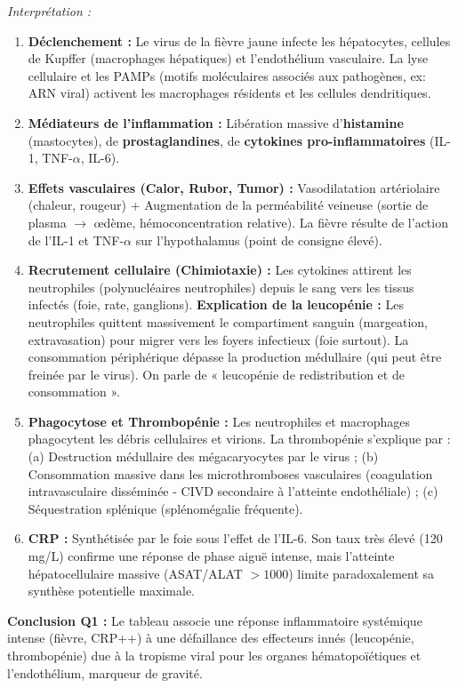 \documentclass[11pt]{article}
\begin{document}
\begin{exoresolu}
\textit{Interprétation :}
\begin{enumerate}
    \item \textbf{Déclenchement :} Le virus de la fièvre jaune infecte les hépatocytes, cellules de Kupffer (macrophages hépatiques) et l'endothélium vasculaire. La lyse cellulaire et les PAMPs (motifs moléculaires associés aux pathogènes, ex: ARN viral) activent les macrophages résidents et les cellules dendritiques.
    \item \textbf{Médiateurs de l'inflammation :} Libération massive d'\textbf{histamine} (mastocytes), de \textbf{prostaglandines}, de \textbf{cytokines pro-inflammatoires} (IL-1, TNF-$\alpha$, IL-6).
    \item \textbf{Effets vasculaires (Calor, Rubor, Tumor) :} Vasodilatation artériolaire (chaleur, rougeur) + Augmentation de la perméabilité veineuse (sortie de plasma $\rightarrow$ œdème, hémoconcentration relative). La fièvre résulte de l'action de l'IL-1 et TNF-$\alpha$ sur l'hypothalamus (point de consigne élevé).
    \item \textbf{Recrutement cellulaire (Chimiotaxie) :} Les cytokines attirent les neutrophiles (polynucléaires neutrophiles) depuis le sang vers les tissus infectés (foie, rate, ganglions). \textbf{Explication de la leucopénie :} Les neutrophiles quittent massivement le compartiment sanguin (margeation, extravasation) pour migrer vers les foyers infectieux (foie surtout). La consommation périphérique dépasse la production médullaire (qui peut être freinée par le virus). On parle de « leucopénie de redistribution et de consommation ».
    \item \textbf{Phagocytose et Thrombopénie :} Les neutrophiles et macrophages phagocytent les débris cellulaires et virions. La thrombopénie s'explique par : (a) Destruction médullaire des mégacaryocytes par le virus ; (b) Consommation massive dans les microthromboses vasculaires (coagulation intravasculaire disséminée - CIVD secondaire à l'atteinte endothéliale) ; (c) Séquestration splénique (splénomégalie fréquente).
    \item \textbf{CRP :} Synthétisée par le foie sous l'effet de l'IL-6. Son taux très élevé (120 mg/L) confirme une réponse de phase aiguë intense, mais l'atteinte hépatocellulaire massive (ASAT/ALAT $> 1000$) limite paradoxalement sa synthèse potentielle maximale.
\end{enumerate}
\textbf{Conclusion Q1 :} Le tableau associe une réponse inflammatoire systémique intense (fièvre, CRP++) à une défaillance des effecteurs innés (leucopénie, thrombopénie) due à la tropisme viral pour les organes hématopoïétiques et l'endothélium, marqueur de gravité.


\end{exoresolu}
\end{document}
